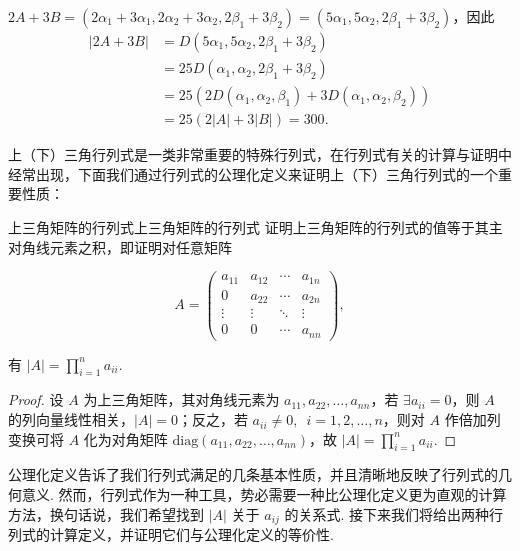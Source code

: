 \begin{solution}
    $2A+3B=(2\alpha_1+3\alpha_1,2\alpha_2+3\alpha_2,2\beta_1+3\beta_2)=(5\alpha_1,5\alpha_2,2\beta_1+3\beta_2)$，因此
    \begin{align*}
        |2A+3B| & =D(5\alpha_1,5\alpha_2,2\beta_1+3\beta_2)                        \\
                & =25D(\alpha_1,\alpha_2,2\beta_1+3\beta_2)                        \\
                & =25(2D(\alpha_1,\alpha_2,\beta_1)+3D(\alpha_1,\alpha_2,\beta_2)) \\
                & =25(2|A|+3|B|)=300.
    \end{align*}
\end{solution}

上（下）三角行列式是一类非常重要的特殊行列式，在行列式有关的计算与证明中经常出现，下面我们通过行列式的公理化定义来证明上（下）三角行列式的一个重要性质：

\begin{example}{上三角矩阵的行列式}{上三角矩阵的行列式}
    证明上三角矩阵的行列式的值等于其主对角线元素之积，即证明对任意矩阵

    \[
        A = \begin{pmatrix}
            a_{11} & a_{12} & \cdots & a_{1n} \\
            0      & a_{22} & \cdots & a_{2n} \\
            \vdots & \vdots & \ddots & \vdots \\
            0      & 0      & \cdots & a_{nn}
        \end{pmatrix},
    \]

    有 $|A| = \prod_{i=1}^n a_{ii}$.
\end{example}

\begin{proof}
    设 $A$ 为上三角矩阵，其对角线元素为 $a_{11}, a_{22}, \ldots, a_{nn}$，若 $\exists a_{ii} = 0$，则 $A$ 的列向量线性相关，$|A| = 0$；反之，若 $a_{ii} \neq 0, \enspace i=1,2,\ldots,n$，则对 $A$ 作倍加列变换可将 $A$ 化为对角矩阵 $\mathrm{diag}(a_{11},a_{22},\ldots,a_{nn})$，故 $|A| = \prod_{i=1}^n a_{ii}$.
\end{proof}

公理化定义告诉了我们行列式满足的几条基本性质，并且清晰地反映了行列式的几何意义. 然而，行列式作为一种工具，势必需要一种比公理化定义更为直观的计算方法，换句话说，我们希望找到 $|A|$ 关于 $a_{ij}$ 的关系式. 接下来我们将给出两种行列式的计算定义，并证明它们与公理化定义的等价性.

